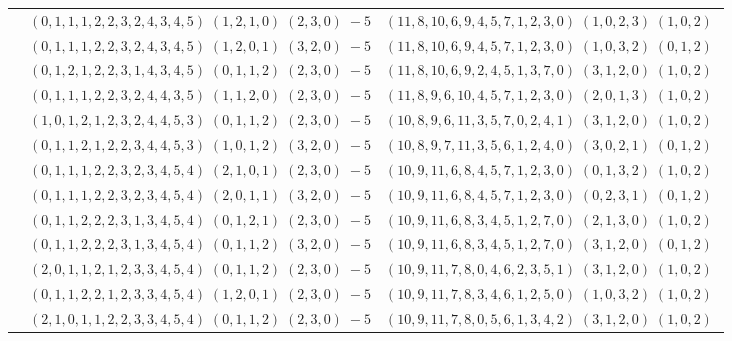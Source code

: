 \documentclass[11pt]{article}
\begin{document}
\begin{longtable}[l]{|c|c|c|}
 \cline{2-3} 
 & $(0 ,1 ,1 ,1 ,2 ,2 ,3 ,2 ,4 ,3 ,4 ,5) \;(1 ,2 ,1 ,0) \;(2 ,3 ,0) \;-5$ & $(11 ,8 ,10 ,6 ,9 ,4 ,5 ,7 ,1 ,2 ,3 ,0) \;(1 ,0 ,2 ,3) \;(1 ,0 ,2) \;$\\ 
 \cline{2-3} 
 & $(0 ,1 ,1 ,1 ,2 ,2 ,3 ,2 ,4 ,3 ,4 ,5) \;(1 ,2 ,0 ,1) \;(3 ,2 ,0) \;-5$ & $(11 ,8 ,10 ,6 ,9 ,4 ,5 ,7 ,1 ,2 ,3 ,0) \;(1 ,0 ,3 ,2) \;(0 ,1 ,2) \;$\\ 
 \cline{2-3} 
 & $(0 ,1 ,2 ,1 ,2 ,2 ,3 ,1 ,4 ,3 ,4 ,5) \;(0 ,1 ,1 ,2) \;(2 ,3 ,0) \;-5$ & $(11 ,8 ,10 ,6 ,9 ,2 ,4 ,5 ,1 ,3 ,7 ,0) \;(3 ,1 ,2 ,0) \;(1 ,0 ,2) \;$\\ 
 \cline{2-3} 
 & $(0 ,1 ,1 ,1 ,2 ,2 ,3 ,2 ,4 ,4 ,3 ,5) \;(1 ,1 ,2 ,0) \;(2 ,3 ,0) \;-5$ & $(11 ,8 ,9 ,6 ,10 ,4 ,5 ,7 ,1 ,2 ,3 ,0) \;(2 ,0 ,1 ,3) \;(1 ,0 ,2) \;$\\ 
 \cline{2-3} 
 & $(1 ,0 ,1 ,2 ,1 ,2 ,3 ,2 ,4 ,4 ,5 ,3) \;(0 ,1 ,1 ,2) \;(2 ,3 ,0) \;-5$ & $(10 ,8 ,9 ,6 ,11 ,3 ,5 ,7 ,0 ,2 ,4 ,1) \;(3 ,1 ,2 ,0) \;(1 ,0 ,2) \;$\\ 
 \cline{2-3} 
 & $(0 ,1 ,1 ,2 ,1 ,2 ,2 ,3 ,4 ,4 ,5 ,3) \;(1 ,0 ,1 ,2) \;(3 ,2 ,0) \;-5$ & $(10 ,8 ,9 ,7 ,11 ,3 ,5 ,6 ,1 ,2 ,4 ,0) \;(3 ,0 ,2 ,1) \;(0 ,1 ,2) \;$\\ 
 \cline{2-3} 
 & $(0 ,1 ,1 ,1 ,2 ,2 ,3 ,2 ,3 ,4 ,5 ,4) \;(2 ,1 ,0 ,1) \;(2 ,3 ,0) \;-5$ & $(10 ,9 ,11 ,6 ,8 ,4 ,5 ,7 ,1 ,2 ,3 ,0) \;(0 ,1 ,3 ,2) \;(1 ,0 ,2) \;$\\ 
 \cline{2-3} 
 & $(0 ,1 ,1 ,1 ,2 ,2 ,3 ,2 ,3 ,4 ,5 ,4) \;(2 ,0 ,1 ,1) \;(3 ,2 ,0) \;-5$ & $(10 ,9 ,11 ,6 ,8 ,4 ,5 ,7 ,1 ,2 ,3 ,0) \;(0 ,2 ,3 ,1) \;(0 ,1 ,2) \;$\\ 
 \cline{2-3} 
 & $(0 ,1 ,1 ,2 ,2 ,2 ,3 ,1 ,3 ,4 ,5 ,4) \;(0 ,1 ,2 ,1) \;(2 ,3 ,0) \;-5$ & $(10 ,9 ,11 ,6 ,8 ,3 ,4 ,5 ,1 ,2 ,7 ,0) \;(2 ,1 ,3 ,0) \;(1 ,0 ,2) \;$\\ 
 \cline{2-3} 
 & $(0 ,1 ,1 ,2 ,2 ,2 ,3 ,1 ,3 ,4 ,5 ,4) \;(0 ,1 ,1 ,2) \;(3 ,2 ,0) \;-5$ & $(10 ,9 ,11 ,6 ,8 ,3 ,4 ,5 ,1 ,2 ,7 ,0) \;(3 ,1 ,2 ,0) \;(0 ,1 ,2) \;$\\ 
 \cline{2-3} 
 & $(2 ,0 ,1 ,1 ,2 ,1 ,2 ,3 ,3 ,4 ,5 ,4) \;(0 ,1 ,1 ,2) \;(2 ,3 ,0) \;-5$ & $(10 ,9 ,11 ,7 ,8 ,0 ,4 ,6 ,2 ,3 ,5 ,1) \;(3 ,1 ,2 ,0) \;(1 ,0 ,2) \;$\\ 
 \cline{2-3} 
 & $(0 ,1 ,1 ,2 ,2 ,1 ,2 ,3 ,3 ,4 ,5 ,4) \;(1 ,2 ,0 ,1) \;(2 ,3 ,0) \;-5$ & $(10 ,9 ,11 ,7 ,8 ,3 ,4 ,6 ,1 ,2 ,5 ,0) \;(1 ,0 ,3 ,2) \;(1 ,0 ,2) \;$\\ 
 \cline{2-3} 
 & $(2 ,1 ,0 ,1 ,1 ,2 ,2 ,3 ,3 ,4 ,5 ,4) \;(0 ,1 ,1 ,2) \;(2 ,3 ,0) \;-5$ & $(10 ,9 ,11 ,7 ,8 ,0 ,5 ,6 ,1 ,3 ,4 ,2) \;(3 ,1 ,2 ,0) \;(1 ,0 ,2) \;$\\ 

\end{longtable}
\end{document}
